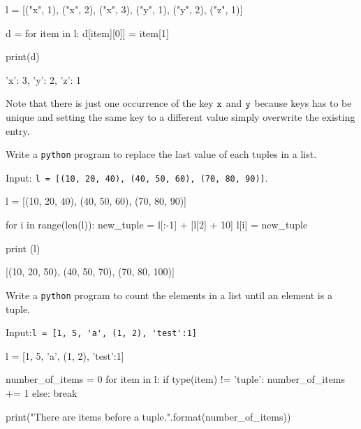 \begin{solution}
\end{solution}

\begin{ipython}
l = [("x", 1), ("x", 2), ("x", 3), ("y", 1), ("y", 2), ("z", 1)]

d = {}
for item in l:
    d[item][0]] = item[1]
    
print(d)

{'x': 3, 'y': 2, 'z': 1}
\end{ipython}
Note that there is just one occurrence of the key $\tt{x}$ and $\tt{y}$ because keys has to be unique and setting the same key to a different value simply overwrite the existing entry.

\begin{question}
Write a \texttt{python} program to replace the last value of each tuples in a list.

\noindent
Input: \lstinline[language=iPython]|l = [(10, 20, 40), (40, 50, 60), (70, 80, 90)]|.
\end{question}

\begin{solution}
\end{solution}
\begin{ipython}
l = [(10, 20, 40), (40, 50, 60), (70, 80, 90)]

for i in range(len(l)):
    new_tuple = l[:-1] + [l[2] + 10]
    l[i] = new_tuple
    
print (l)

[(10, 20, 50), (40, 50, 70), (70, 80, 100)]
\end{ipython}

\begin{question}
Write a \texttt{python} program to count the elements in a list until an element is a tuple.

\noindent
Input:\lstinline[language=iPython]|l = [1, 5, 'a', (1, 2), 'test':1]|
\end{question}

\begin{solution}
\end{solution}

\begin{ipython}
l = [1, 5, 'a', (1, 2), 'test':1]

number_of_items = 0 
for item in l:
    if type(item) != 'tuple'{:}
        number_of_items += 1
    else:
        break
        
print("There are {} items before a tuple.".format(number_of_items))
\end{ipython}

